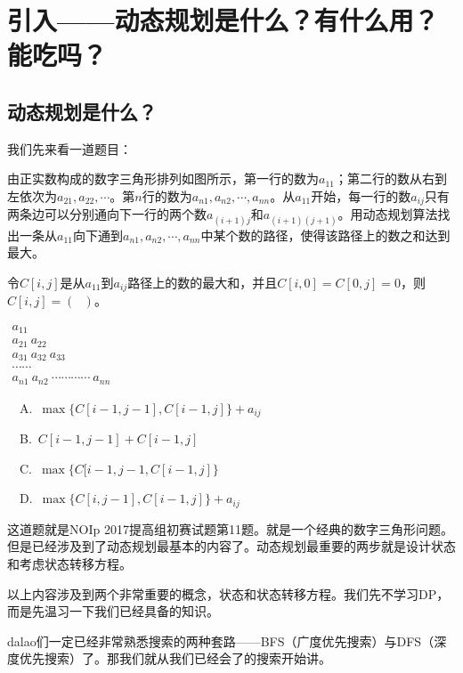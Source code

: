 \section{引入------动态规划是什么？有什么用？能吃吗？}
\subsection{动态规划是什么？}
我们先来看一道题目：

\begin{example}由正实数构成的数字三角形排列如图所示，第一行的数为$a_{11}$；第二行的数从右到左依次为$a_{21},a_{22},\cdots$。第$n$行的数为$a_{n1},a_{n2},\cdots,a_{nn}$。从$a_{11}$开始，每一行的数$a_{ij}$只有两条边可以分别通向下一行的两个数$a_{(i+1)j}$和$a_{(i+1)(j+1)}$。用动态规划算法找出一条从$a_{11}$向下通到$a_{n1},a_{n2},\cdots,a_{nn}$中某个数的路径，使得该路径上的数之和达到最大。

	令$C[i,j]$是从$a_{11}$到$a_{ij}$路径上的数的最大和，并且$C[i,0]=C[0,j]=0$，则$C[i,j]=(\ \ \ )$。
	\begin{center}
		\begin{math}
			\begin{matrix}
				a_{11}                 \\
				a_{21}\ a_{22}         \\
				a_{31}\ a_{32}\ a_{33} \\
				\cdots\cdots           \\
				a_{n1}\ a_{n2}\ \cdots\cdots\cdots\cdots\ a_{nn}
			\end{matrix}
		\end{math}
	\end{center}

	\ \ A.\ $\max\{C[i-1,j-1],C[i-1,j]\}+a_{ij}$

	\ \ B.\ $C[i-1,j-1]+C[i-1,j]$

	\ \ C.\ $\max\{C[i-1,j-1,C[i-1,j]\}$

	\ \ D.\ $\max\{C[i,j-1],C[i-1,j]\}+a_{ij}$
\end{example}

这道题就是NOIp 2017提高组初赛试题第11题。就是一个经典的数字三角形问题。但是已经涉及到了动态规划最基本的内容了。动态规划最重要的两步就是设计状态和考虑状态转移方程。

以上内容涉及到两个非常重要的概念，状态和状态转移方程。我们先不学习DP，而是先温习一下我们已经具备的知识。

dalao们一定已经非常熟悉搜索的两种套路------BFS（广度优先搜索）与DFS（深度优先搜索）了。那我们就从我们已经会了的搜索开始讲。

